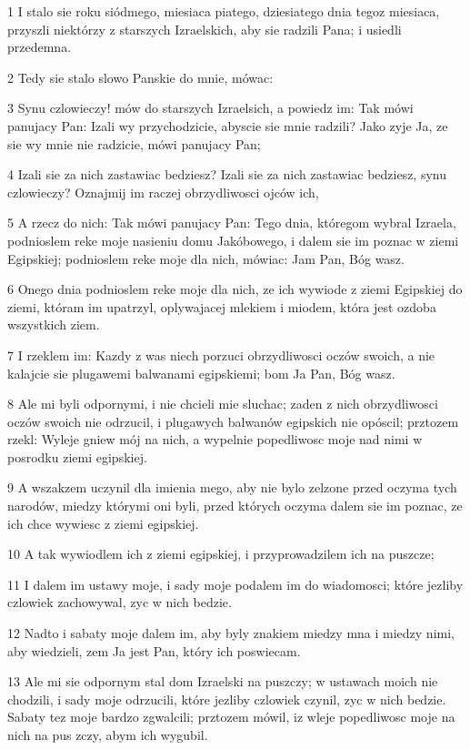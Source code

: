 \par 1 I stalo sie roku siódmego, miesiaca piatego, dziesiatego dnia tegoz miesiaca, przyszli niektórzy z starszych Izraelskich, aby sie radzili Pana; i usiedli przedemna.
\par 2 Tedy sie stalo slowo Panskie do mnie, mówac:
\par 3 Synu czlowieczy! mów do starszych Izraelsich, a powiedz im: Tak mówi panujacy Pan: Izali wy przychodzicie, abyscie sie mnie radzili? Jako zyje Ja, ze sie wy mnie nie radzicie, mówi panujacy Pan;
\par 4 Izali sie za nich zastawiac bedziesz? Izali sie za nich zastawiac bedziesz, synu czlowieczy? Oznajmij im raczej obrzydliwosci ojców ich,
\par 5 A rzecz do nich: Tak mówi panujacy Pan: Tego dnia, któregom wybral Izraela, podnioslem reke moje nasieniu domu Jakóbowego, i dalem sie im poznac w ziemi Egipskiej; podnioslem reke moje dla nich, mówiac: Jam Pan, Bóg wasz.
\par 6 Onego dnia podnioslem reke moje dla nich, ze ich wywiode z ziemi Egipskiej do ziemi, któram im upatrzyl, oplywajacej mlekiem i miodem, która jest ozdoba wszystkich ziem.
\par 7 I rzeklem im: Kazdy z was niech porzuci obrzydliwosci oczów swoich, a nie kalajcie sie plugawemi balwanami egipskiemi; bom Ja Pan, Bóg wasz.
\par 8 Ale mi byli odpornymi, i nie chcieli mie sluchac; zaden z nich obrzydliwosci oczów swoich nie odrzucil, i plugawych balwanów egipskich nie opóscil; prztozem rzekl: Wyleje gniew mój na nich, a wypelnie popedliwosc moje nad nimi w posrodku ziemi egipskiej.
\par 9 A wszakzem uczynil dla imienia mego, aby nie bylo zelzone przed oczyma tych narodów, miedzy którymi oni byli, przed których oczyma dalem sie im poznac, ze ich chce wywiesc z ziemi egipskiej.
\par 10 A tak wywiodlem ich z ziemi egipskiej, i przyprowadzilem ich na puszcze;
\par 11 I dalem im ustawy moje, i sady moje podalem im do wiadomosci; które jezliby czlowiek zachowywal, zyc w nich bedzie.
\par 12 Nadto i sabaty moje dalem im, aby byly znakiem miedzy mna i miedzy nimi, aby wiedzieli, zem Ja jest Pan, który ich poswiecam.
\par 13 Ale mi sie odpornym stal dom Izraelski na puszczy; w ustawach moich nie chodzili, i sady moje odrzucili, które jezliby czlowiek czynil, zyc w nich bedzie. Sabaty tez moje bardzo zgwalcili; prztozem mówil, iz wleje popedliwosc moje na nich na pus zczy, abym ich wygubil.
